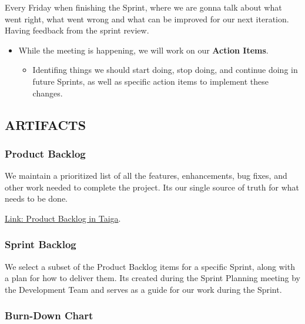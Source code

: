 Every Friday when finishing the Sprint, where we are gonna talk about
what went right, what went wrong and what can be improved for our next
iteration. Having feedback from the sprint review.

\begin{itemize}
\tightlist
\item
  While the meeting is happening, we will work on our \textbf{Action
  Items}.

  \begin{itemize}
  \tightlist
  \item
    Identifing things we should start doing, stop doing, and continue
    doing in future Sprints, as well as specific action items to
    implement these changes.
  \end{itemize}
\end{itemize}

\newpage

\hypertarget{artifacts}{
\subsection{ARTIFACTS}\label{artifacts}}

\hypertarget{productbacklog}{
\subsubsection{\texorpdfstring{\textbf{Product
Backlog}}{Product Backlog}}\label{productbacklog}}

We maintain a prioritized list of all the features, enhancements, bug
fixes, and other work needed to complete the project.
It\textquotesingle s our single source of truth for what needs to be
done.

\href{https://tree.taiga.io/project/joseluis-teran-coffeetime/backlog}{Link: Product Backlog in Taiga}.

\hypertarget{sprintbacklog}{
\subsubsection{\texorpdfstring{\textbf{Sprint
Backlog}}{Sprint Backlog}}\label{sprintbacklog}}

We select a subset of the Product Backlog items for a specific Sprint,
along with a plan for how to deliver them. It\textquotesingle s created
during the Sprint Planning meeting by the Development Team and serves as
a guide for our work during the Sprint.

\hypertarget{burndownchart}{
\subsubsection{\texorpdfstring{\textbf{Burn-Down
Chart}}{Burn-Down Chart}}\label{burndownchart}}

